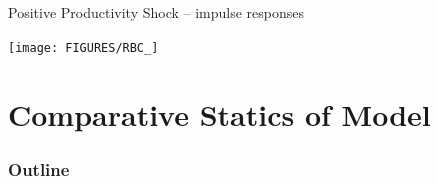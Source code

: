 \documentclass{beamer}
\newcommand{\tb}[1]{{\color{blue}{\textbf{#1}}}}
\begin{document}
%
%
%
%
%

\begin{frame}{Positive Productivity Shock -- impulse responses} 



\centering
\texttt{[image: FIGURES/RBC\_]} 


\end{frame}

\section{Comparative Statics of Model}

\begin{frame}
\frametitle{Outline}
\tableofcontents[currentsection]
\end{frame}
\end{document}
